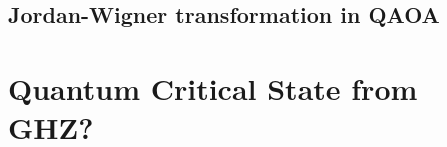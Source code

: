 \documentclass{book}
\theoremstyle{definition}
\begin{document}
\subsection{Jordan-Wigner transformation in QAOA}



 

 
 
 
 
 \newpage
 
 
\section{Quantum Critical State from GHZ?}
\end{document}

